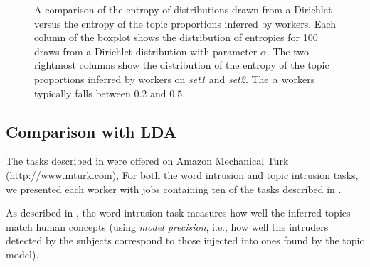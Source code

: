 \begin{figure}
\centering
{}%

\caption{A comparison of the entropy of distributions drawn from a
  Dirichlet versus the entropy of the topic proportions inferred by
  workers.  Each column of the boxplot shows the distribution of
  entropies for 100 draws from a Dirichlet distribution with parameter
  $\alpha$.  The two rightmost columns show the distribution of the
  entropy of the topic proportions inferred by workers on \emph{set1}
  and \emph{set2}.  The $\alpha$ workers typically falls between 0.2
  and 0.5.}

\label{fig:entropy}
\end{figure}

\subsection{Comparison with LDA}

The tasks described in  were offered on Amazon
Mechanical Turk (http://www.mturk.com), 
For both the word intrusion and topic intrusion tasks, we presented
each worker with jobs containing ten of the tasks described in
.

As described in , the word intrusion task
measures how well the inferred topics match human concepts (using
\emph{model precision}, i.e., how well the intruders detected by the
subjects correspond to those injected into ones found by the topic model).  


